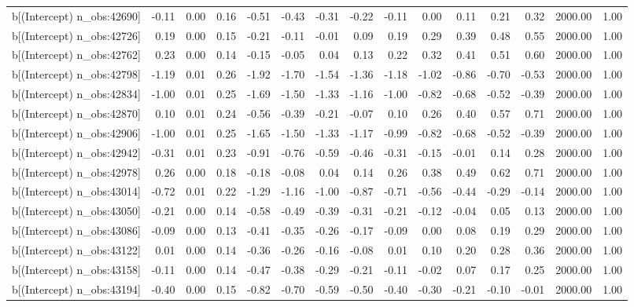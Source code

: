 \begin{table}[ht]
\begin{tabular}{rrrrrrrrrrrrrrr}
  b[(Intercept) n\_obs:42690] & -0.11 & 0.00 & 0.16 & -0.51 & -0.43 & -0.31 & -0.22 & -0.11 & 0.00 & 0.11 & 0.21 & 0.32 & 2000.00 & 1.00 \\ 
  b[(Intercept) n\_obs:42726] & 0.19 & 0.00 & 0.15 & -0.21 & -0.11 & -0.01 & 0.09 & 0.19 & 0.29 & 0.39 & 0.48 & 0.55 & 2000.00 & 1.00 \\ 
  b[(Intercept) n\_obs:42762] & 0.23 & 0.00 & 0.14 & -0.15 & -0.05 & 0.04 & 0.13 & 0.22 & 0.32 & 0.41 & 0.51 & 0.60 & 2000.00 & 1.00 \\ 
  b[(Intercept) n\_obs:42798] & -1.19 & 0.01 & 0.26 & -1.92 & -1.70 & -1.54 & -1.36 & -1.18 & -1.02 & -0.86 & -0.70 & -0.53 & 2000.00 & 1.00 \\ 
  b[(Intercept) n\_obs:42834] & -1.00 & 0.01 & 0.25 & -1.69 & -1.50 & -1.33 & -1.16 & -1.00 & -0.82 & -0.68 & -0.52 & -0.39 & 2000.00 & 1.00 \\ 
  b[(Intercept) n\_obs:42870] & 0.10 & 0.01 & 0.24 & -0.56 & -0.39 & -0.21 & -0.07 & 0.10 & 0.26 & 0.40 & 0.57 & 0.71 & 2000.00 & 1.00 \\ 
  b[(Intercept) n\_obs:42906] & -1.00 & 0.01 & 0.25 & -1.65 & -1.50 & -1.33 & -1.17 & -0.99 & -0.82 & -0.68 & -0.52 & -0.39 & 2000.00 & 1.00 \\ 
  b[(Intercept) n\_obs:42942] & -0.31 & 0.01 & 0.23 & -0.91 & -0.76 & -0.59 & -0.46 & -0.31 & -0.15 & -0.01 & 0.14 & 0.28 & 2000.00 & 1.00 \\ 
  b[(Intercept) n\_obs:42978] & 0.26 & 0.00 & 0.18 & -0.18 & -0.08 & 0.04 & 0.14 & 0.26 & 0.38 & 0.49 & 0.62 & 0.71 & 2000.00 & 1.00 \\ 
  b[(Intercept) n\_obs:43014] & -0.72 & 0.01 & 0.22 & -1.29 & -1.16 & -1.00 & -0.87 & -0.71 & -0.56 & -0.44 & -0.29 & -0.14 & 2000.00 & 1.00 \\ 
  b[(Intercept) n\_obs:43050] & -0.21 & 0.00 & 0.14 & -0.58 & -0.49 & -0.39 & -0.31 & -0.21 & -0.12 & -0.04 & 0.05 & 0.13 & 2000.00 & 1.00 \\ 
  b[(Intercept) n\_obs:43086] & -0.09 & 0.00 & 0.13 & -0.41 & -0.35 & -0.26 & -0.17 & -0.09 & 0.00 & 0.08 & 0.19 & 0.29 & 2000.00 & 1.00 \\ 
  b[(Intercept) n\_obs:43122] & 0.01 & 0.00 & 0.14 & -0.36 & -0.26 & -0.16 & -0.08 & 0.01 & 0.10 & 0.20 & 0.28 & 0.36 & 2000.00 & 1.00 \\ 
  b[(Intercept) n\_obs:43158] & -0.11 & 0.00 & 0.14 & -0.47 & -0.38 & -0.29 & -0.21 & -0.11 & -0.02 & 0.07 & 0.17 & 0.25 & 2000.00 & 1.00 \\ 
  b[(Intercept) n\_obs:43194] & -0.40 & 0.00 & 0.15 & -0.82 & -0.70 & -0.59 & -0.50 & -0.40 & -0.30 & -0.21 & -0.10 & -0.01 & 2000.00 & 1.00 \\ 

\end{tabular}
\end{table}
